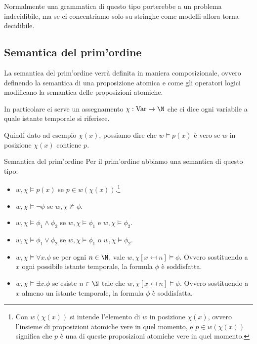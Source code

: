 \begin{note}{}
  Normalmente una grammatica di questo tipo porterebbe a un problema indecidibile, ma se ci concentriamo solo su stringhe come modelli allora torna decidibile.
\end{note}

\subsection{Semantica del prim'ordine}
La semantica del prim'ordine verrà definita in maniera composizionale, ovvero definendo la semantica di una proposizione atomica e come gli operatori logici modificano la semantica delle proposizioni atomiche.

In particolare ci serve un assegnamento \(\chi : \Var \to \N\) che ci dice ogni variabile a quale istante temporale si riferisce.

Quindi dato ad esempio \(\chi(x)\), possiamo dire che \(w \models p(x)\) è vero se \(w\) in posizione \(\chi(x)\) contiene \(p\).

\begin{definition}{Semantica del prim'ordine}
  Per il prim'ordine abbiamo una semantica di questo tipo:
  \begin{itemize}
    \item \(w,\chi \models p(x)\) se \(p \in w(\chi(x))\).\footnote{Con \(w(\chi(x))\) si intende l'elemento di \(w\) in posizione \(\chi(x)\), ovvero l'insieme di proposizioni atomiche vere in quel momento, e \(p \in w(\chi(x))\) significa che \(p\) è una di queste proposizioni atomiche vere in quel momento.}
    \item \(w,\chi \models \neg \phi\) se \(w,\chi \not\models \phi\).
    \item \(w,\chi \models \phi_1 \land \phi_2\) se \(w,\chi \models \phi_1\) e \(w,\chi \models \phi_2\).
    \item \(w,\chi \models \phi_1 \lor \phi_2\) se \(w,\chi \models \phi_1\) o \(w,\chi \models \phi_2\).
    \item \(w,\chi \models \forall x.\phi\) se per ogni \(n \in \N\), vale \(w,\chi[x \mapsfrom n] \models \phi\).
          Ovvero sostituendo a \(x\) ogni possibile istante temporale, la formula \(\phi\) è soddisfatta.
    \item \(w,\chi \models \exists x.\phi\) se esiste \(n \in \N\) tale che \(w,\chi[x \mapsfrom n] \models \phi\).
          Ovvero sostituendo a \(x\) almeno un istante temporale, la formula \(\phi\) è soddisfatta.
  \end{itemize}
\end{definition}

